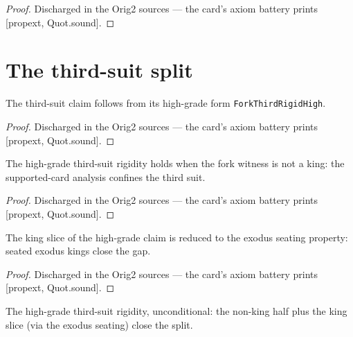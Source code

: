 \begin{proof}
\leanok
Discharged in the Orig2 sources --- the card's axiom battery prints [propext, Quot.sound].
\end{proof}

\section{The third-suit split}

\begin{theorem}\label{thm:thirdReduce}
\leanok
{}
The third-suit claim follows from its high-grade form
\texttt{ForkThirdRigidHigh}.
\end{theorem}

\begin{proof}
\leanok
Discharged in the Orig2 sources --- the card's axiom battery prints [propext, Quot.sound].
\end{proof}

\begin{theorem}\label{thm:thirdNonKing}
\leanok
{}
The high-grade third-suit rigidity holds when the fork witness is
not a king: the supported-card analysis confines the third suit.
\end{theorem}

\begin{proof}
\leanok
Discharged in the Orig2 sources --- the card's axiom battery prints [propext, Quot.sound].
\end{proof}

\begin{theorem}\label{thm:thirdKing}
\leanok
{}
The king slice of the high-grade claim is reduced to the exodus
seating property: seated exodus kings close the gap.
\end{theorem}

\begin{proof}
\leanok
Discharged in the Orig2 sources --- the card's axiom battery prints [propext, Quot.sound].
\end{proof}

\begin{theorem}\label{thm:thirdHigh}
\leanok
{}
The high-grade third-suit rigidity, unconditional: the non-king
half plus the king slice (via the exodus seating) close the
split.
\end{theorem}


